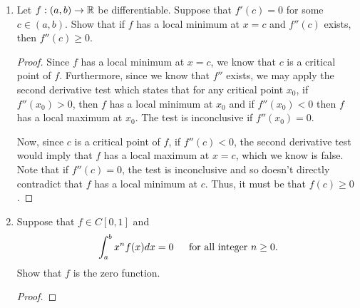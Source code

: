 \documentclass[12pt]{article}
\theoremstyle{plain}
\begin{document}
\begin{enumerate}
    \item Let $f:(a,b) \to \mathbb{R}$ be differentiable.
    Suppose that $f'(c) = 0$ for some $c\in (a,b)$.
    Show that if $f$ has a local minimum at $x=c$ and $f''(c)$ exists, then $f''(c) \geq 0$.

    \begin{proof}
        Since $f$ has a local minimum at $x = c$,  we know that $c$ is a critical point of $f$.
        Furthermore, since we know that $f''$ exists, we may apply the second derivative test which states that for any critical point $x_0$, if $f''(x_0) > 0$, then $f$ has a local minimum at $x_0$ and if $f''(x_0) < 0$ then $f$ has a local maximum at $x_0$.
        The test is inconclusive if $f''(x_0) = 0$.

        Now, since $c$ is a critical point of $f$, if $f''(c) < 0$, the second derivative test would imply that $f$ has a local maximum at $x = c$, which we know is false.
        Note that if $f''(c) = 0$, the test is inconclusive and so doesn't directly contradict that $f$ has a local minimum at $c$.
        Thus, it must be that $f(c) \geq 0$.
    \end{proof}

    \newpage\item Suppose that $f\in C[0,1]$ and 
    \[
        \int_a^b{x^nf(x)dx} = 0 \textrm{\hspace{12pt} for all integer } n\geq 0.
    \]
    Show that $f$ is the zero function.

    \begin{proof}
        
    \end{proof}
\end{enumerate}
\end{document}
